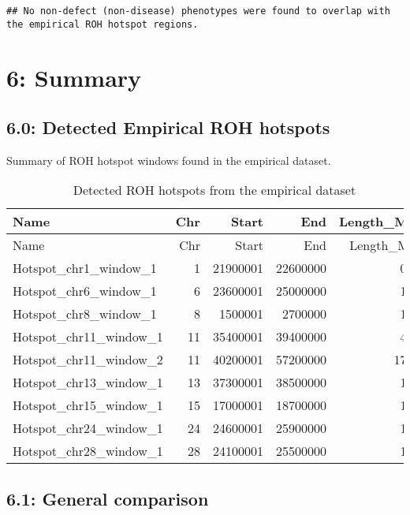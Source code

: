 \documentclass[
]{article}
\begin{document}
\begin{verbatim}
## No non-defect (non-disease) phenotypes were found to overlap with the empirical ROH hotspot regions.
\end{verbatim}

\section{6: Summary}\label{summary}

\subsection{6.0: Detected Empirical ROH
hotspots}\label{detected-empirical-roh-hotspots}

Summary of ROH hotspot windows found in the empirical dataset.

\begin{longtable}[]{@{}lrrrr@{}}
\caption{Detected ROH hotspots from the empirical
dataset}\tabularnewline
\toprule\noalign{}
Name & Chr & Start & End & Length\_Mb \\
\midrule\noalign{}
\endfirsthead
\toprule\noalign{}
Name & Chr & Start & End & Length\_Mb \\
\midrule\noalign{}
\endhead
\bottomrule\noalign{}
\endlastfoot
Hotspot\_chr1\_window\_1 & 1 & 21900001 & 22600000 & 0.7 \\
Hotspot\_chr6\_window\_1 & 6 & 23600001 & 25000000 & 1.4 \\
Hotspot\_chr8\_window\_1 & 8 & 1500001 & 2700000 & 1.2 \\
Hotspot\_chr11\_window\_1 & 11 & 35400001 & 39400000 & 4.0 \\
Hotspot\_chr11\_window\_2 & 11 & 40200001 & 57200000 & 17.0 \\
Hotspot\_chr13\_window\_1 & 13 & 37300001 & 38500000 & 1.2 \\
Hotspot\_chr15\_window\_1 & 15 & 17000001 & 18700000 & 1.7 \\
Hotspot\_chr24\_window\_1 & 24 & 24600001 & 25900000 & 1.3 \\
Hotspot\_chr28\_window\_1 & 28 & 24100001 & 25500000 & 1.4 \\
\end{longtable}

\subsection{6.1: General comparison}\label{general-comparison}
\end{document}
